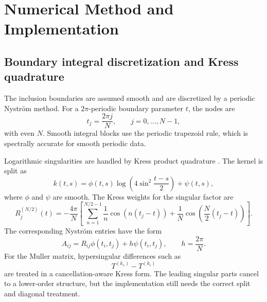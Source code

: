 %
%
%
%
%

\section{Numerical Method and Implementation}

\subsection{Boundary integral discretization and Kress quadrature}

The inclusion boundaries are assumed smooth and are discretized by a periodic
Nystr\"om method.  For a \(2\pi\)-periodic boundary parameter \(t\), the nodes are
\[
  t_j=\frac{2\pi j}{N},
  \qquad
  j=0,\ldots,N-1,
\]
with even \(N\).  Smooth integral blocks use the periodic trapezoid rule, which
is spectrally accurate for smooth periodic data.

Logarithmic singularities are handled by Kress product quadrature
\cite{Kress1991,Kress2014}.  The kernel is split as
\[
  k(t,s)
  =
  \phi(t,s)\log\!\left(4\sin^2\frac{t-s}{2}\right)
  +
  \psi(t,s),
\]
where \(\phi\) and \(\psi\) are smooth.  The Kress weights for the singular
factor are
\[
  R_j^{(N/2)}(t)
  =
  -\frac{4\pi}{N}
  \left[
  \sum_{n=1}^{N/2-1}\frac{1}{n}\cos(n(t_j-t))
  +
  \frac{1}{N}\cos\!\left(\frac{N}{2}(t_j-t)\right)
  \right].
\]
The corresponding Nystr\"om entries have the form
\[
  A_{ij}=R_{ij}\phi(t_i,t_j)+h\psi(t_i,t_j),
  \qquad
  h=\frac{2\pi}{N}.
\]
For the Muller matrix, hypersingular differences such as
\[
  T^{(k_e)}-T^{(k_i)}
\]
are treated in a cancellation-aware Kress form.  The leading singular parts
cancel to a lower-order structure, but the implementation still needs the
correct split and diagonal treatment.

